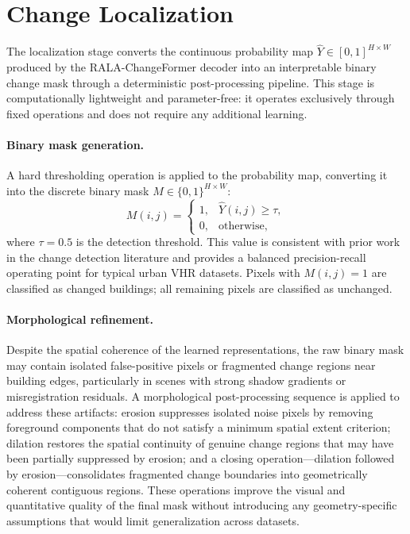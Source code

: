 \section{Change Localization}
\label{sec:localization}

The localization stage converts the continuous probability map
$\hat{Y} \in [0,1]^{H \times W}$ produced by the RALA-ChangeFormer decoder
into an interpretable binary change mask through a deterministic
post-processing pipeline. This stage is computationally lightweight and
parameter-free: it operates exclusively through fixed operations and does not
require any additional learning.

\paragraph{Binary mask generation.}
A hard thresholding operation is applied to the probability map, converting
it into the discrete binary mask $M \in \{0,1\}^{H \times W}$:
\begin{equation}
M(i,j) =
\begin{cases}
1, & \hat{Y}(i,j) \geq \tau, \\
0, & \text{otherwise,}
\end{cases}
\label{eq:masking}
\end{equation}
where $\tau = 0.5$ is the detection threshold. This value is consistent with
prior work in the change detection literature \cite{Bandara2022ChangeFormer,
Zheng2022HFANet} and provides a balanced precision-recall operating point for
typical urban VHR datasets. Pixels with $M(i,j) = 1$ are classified as
changed buildings; all remaining pixels are classified as unchanged.

\paragraph{Morphological refinement.}
Despite the spatial coherence of the learned representations, the raw binary
mask may contain isolated false-positive pixels or fragmented change regions
near building edges, particularly in scenes with strong shadow gradients or
misregistration residuals. A morphological post-processing sequence is applied
to address these artifacts: erosion suppresses isolated noise pixels by removing
foreground components that do not satisfy a minimum spatial extent criterion;
dilation restores the spatial continuity of genuine change regions that may
have been partially suppressed by erosion; and a closing operation---dilation
followed by erosion---consolidates fragmented change boundaries into
geometrically coherent contiguous regions. These operations improve the visual
and quantitative quality of the final mask without introducing any
geometry-specific assumptions that would limit generalization across datasets.

